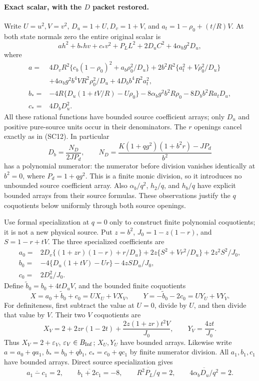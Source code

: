 \paragraph{Exact scalar, with the $D$ packet restored.}
Write $U=u^2,V=v^2$, $D_u=1+U,D_v=1+V$, and
$a_t=1-\rho_0+(t/R)V$. At both state normals zero the entire original
scalar is
\[
 a h^2+b_*hv+c_*v^2+P_L L^2+2D_uC^2+4\alpha_b g^2D_u,
 \tag{QI2}
\]
where
\begin{align*}
 a={}&4D_vR^2\{c_b(1-\rho_0)^2+a_b\rho_0^2/D_u\}
 +2b^2R^2\{a_t^2+V\rho_0^2/D_u\}\\
 &+4\alpha_b g^2b^4VR^2\rho_0^2/D_u
 +4D_bb^4R^2a_t^2,\\
 b_*={}&-4R\{D_u(1+tV/R)-U\rho_0\}
 -8\alpha_b g^2b^2R\rho_0-8D_bb^2Ra_tD_u,\\
 c_*={}&4D_bD_u^2.
\end{align*}
All these rational functions have bounded source coefficient arrays;
only $D_u$ and positive pure-source units occur in their denominators.
The $r$ openings cancel exactly as in (SC12).
In particular
\[
 D_b=\frac{N_D}{2JP_d},\qquad
 N_D=\frac{K(1+qg^2)(1+b^2r)-JP_d}{b^2}
\]
has a polynomial numerator: the numerator before division vanishes
identically at $b^2=0$, where $P_d=1+qg^2$. This is a finite monic
division, so it introduces no unbounded source coefficient array.
Also $\alpha_b/q^2$, $h_2/q$, and $h_b/q$ have explicit bounded
arrays from their source formulas. These observations justify the
$q$ coquotients below uniformly through both source openings.

Use formal specialization at $q=0$ only to construct finite polynomial
coquotients; it is not a new physical source. Put $z=b^2$,
$J_0=1-z(1-r)$, and $S=1-r+tV$. The three specialized coefficients are
\begin{align*}
 a_0={}&2D_v\{(1+zr)(1-r)+r/D_u\}
       +2z\{S^2+Vr^2/D_u\}+2z^2S^2/J_0,\\
 b_0={}&-4\{D_u(1+tV)-Ur\}-4zSD_u/J_0,\\
 c_0={}&2D_u^2/J_0.
\end{align*}
Define $\widetilde b_0=b_0+4tD_uV$, and the bounded finite
coquotients
\[
 X=a_0+\widetilde b_0+c_0=U X_U+V X_V,
 \qquad Y=-\widetilde b_0-2c_0=U Y_U+V Y_V.
 \tag{QI3}
\]
For definiteness, first subtract the value at $U=0$, divide by $U$,
and then divide that value by $V$. Their two $V$ coquotients are
\[
 X_V=2+2zr(1-2t)+\frac{2z(1+zr)t^2V}{J_0},
 \qquad Y_V=\frac{4zt}{J_0}.
 \tag{QI4}
\]
Thus $X_V=2+\varepsilon_V$, $\varepsilon_V\in B_{\rm Inf}$;
$X_U,Y_U$ have bounded arrays. Likewise write
$a=a_0+qa_1$, $b_*=b_0+qb_1$, $c_*=c_0+qc_1$ by finite numerator
division. All $a_1,b_1,c_1$ have bounded arrays. Direct source
specialization gives
\[
 \overline{a_1-c_1}=2,\qquad
 \overline{b_1+2c_1}=-8,\qquad
 \overline{R^2P_L/q}=2,\qquad
 \overline{4\alpha_bD_u/q^2}=2.
 \tag{QI5}
\]

